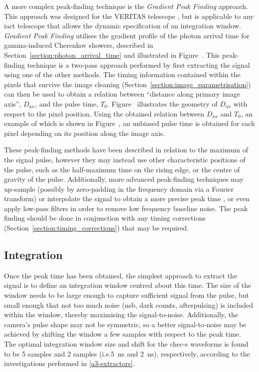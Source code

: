  A more complex peak-finding technique is the \textit{Gradient Peak Finding} approach. This approach was designed for the VERITAS telescope \cite{Holder2005}\cite{Cogan2006}\cite{Cogan2007}, but is applicable to any \gls{iact} telescope that allows the dynamic specification of an integration window. \textit{Gradient Peak Finding} utilises the gradient profile of the photon arrival time for gamma-induced Cherenkov showers, described in Section~\ref{section:photon_arrival_time} and illustrated in Figure~. This peak-finding technique is a two-pass approach performed by first extracting the signal using one of the other methods. The timing information contained within the pixels that survive the image cleaning (Section~\ref{section:image_parametrisation}) can then be used to obtain a relation between ``distance along primary image axis'', $D_{ax}$, and the pulse time, $T_0$. Figure~ illustrates the geometry of $D_{ax}$ with respect to the pixel position. Using the obtained relation between $D_{ax}$ and $T_0$, an example of which is shown in Figure~, an unbiased pulse time is obtained for each pixel depending on its position along the image axis.

These peak-finding methods have been described in relation to the maximum of the signal pulse, however they may instead use other characteristic positions of the pulse, such as the half-maximum time on the rising edge, or the centre of gravity of the pulse. Additionally, more advanced peak-finding techniques may up-sample (possibly by zero-padding in the frequency domain via a Fourier transform) or interpolate the signal to obtain a more precise peak time \cite{Cogan2006, Cogan2007}, or even apply low-pass filters in order to remove low frequency baseline noise. The peak finding should be done in conjunction with any timing corrections (Section~\ref{section:timing_corrections}) that may be required.

\subsection{Integration}

Once the peak time has been obtained, the simplest approach to extract the signal is to define an integration window centred about this time. The size of the window needs to be large enough to capture sufficient signal from the pulse, but small enough that not too much noise (\gls{nsb}, dark counts, afterpulsing) is included within the window, thereby maximising the signal-to-noise. Additionally, the camera's pulse shape may not be symmetric, so a better signal-to-noise may be achieved by shifting the window a few samples with respect to the peak time. The optimal integration window size and shift for the \gls{chec-s} waveforms is found to be 5 samples and 2 samples (i.e.\@ \SI{5}{ns} and \SI{2}{ns}), respectively, according to the investigations performed in \ref{a3-extractors}.

